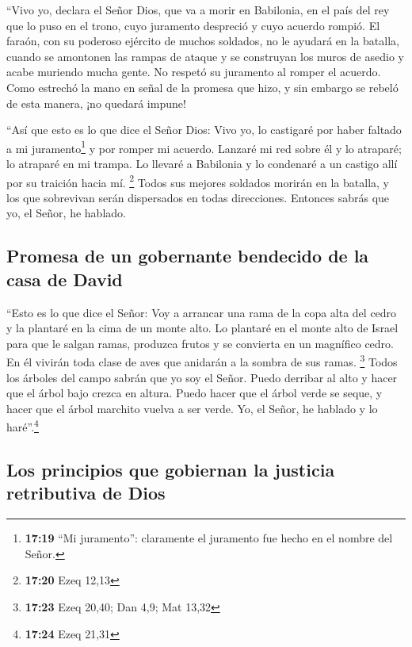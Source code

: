  ``Vivo yo, declara el Señor Dios, que va a morir en
Babilonia, en el país del rey que lo puso en el trono, cuyo juramento
despreció y cuyo acuerdo rompió.  El faraón, con su
poderoso ejército de muchos soldados, no le ayudará en la batalla,
cuando se amontonen las rampas de ataque y se construyan los muros de
asedio y acabe muriendo mucha gente.  No respetó su
juramento al romper el acuerdo. Como estrechó la mano en señal de la
promesa que hizo, y sin embargo se rebeló de esta manera, ¡no quedará
impune!

 ``Así que esto es lo que dice el Señor Dios: Vivo yo, lo
castigaré por haber faltado a mi juramento\footnote{\textbf{17:19} ``Mi
  juramento'': claramente el juramento fue hecho en el nombre del Señor.}
y por romper mi acuerdo.  Lanzaré mi red sobre él y lo
atraparé; lo atraparé en mi trampa. Lo llevaré a Babilonia y lo
condenaré a un castigo allí por su traición hacia mí. \footnote{\textbf{17:20}
  Ezeq 12,13}  Todos sus mejores soldados morirán en la
batalla, y los que sobrevivan serán dispersados en todas direcciones.
Entonces sabrás que yo, el Señor, he hablado.

\hypertarget{promesa-de-un-gobernante-bendecido-de-la-casa-de-david}{%
\subsection{Promesa de un gobernante bendecido de la casa de
David}\label{promesa-de-un-gobernante-bendecido-de-la-casa-de-david}}

 ``Esto es lo que dice el Señor: Voy a arrancar una rama
de la copa alta del cedro y la plantaré en la cima de un monte alto.
 Lo plantaré en el monte alto de Israel para que le
salgan ramas, produzca frutos y se convierta en un magnífico cedro. En
él vivirán toda clase de aves que anidarán a la sombra de sus ramas.
\footnote{\textbf{17:23} Ezeq 20,40; Dan 4,9; Mat 13,32} 
Todos los árboles del campo sabrán que yo soy el Señor. Puedo derribar
al alto y hacer que el árbol bajo crezca en altura. Puedo hacer que el
árbol verde se seque, y hacer que el árbol marchito vuelva a ser verde.
Yo, el Señor, he hablado y lo haré''.\footnote{\textbf{17:24} Ezeq 21,31}

\hypertarget{los-principios-que-gobiernan-la-justicia-retributiva-de-dios}{%
\subsection{Los principios que gobiernan la justicia retributiva de
Dios}\label{los-principios-que-gobiernan-la-justicia-retributiva-de-dios}}

